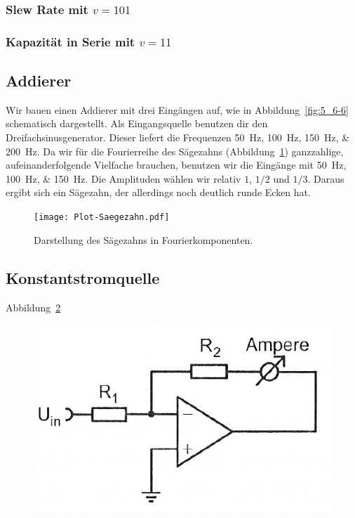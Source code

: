 \subsubsection{Slew Rate mit $v = 101$}

\subsubsection{Kapazität in Serie mit $v = 11$}

\FloatBarrier
\subsection{Addierer}

Wir bauen einen Addierer mit drei Eingängen auf, wie in
Abbildung~\ref{fig:5_6-6} schematisch dargestellt. Als Eingangsquelle benutzen
dir den Dreifachsinusgenerator. Dieser liefert die Frequenzen
\SIlist{50;100;150;200}{\hertz}. Da wir für die Fourierreihe des Sägezahns
(Abbildung~\ref{fig:saegezahn}) ganzzahlige, aufeinanderfolgende Vielfache
brauchen, benutzen wir die Eingänge mit \SIlist{50;100;150}{\hertz}. Die
Amplituden wählen wir relativ $1$, $1/2$ und $1/3$. Daraus ergibt sich ein
Sägezahn, der allerdings noch deutlich runde Ecken hat.

\begin{figure}[htbp]
	\centering
	\texttt{[image: Plot-Saegezahn.pdf]}
	\caption{%
		Darstellung des Sägezahns in Fourierkomponenten.
	}
	\label{fig:saegezahn}
\end{figure}

\FloatBarrier
\subsection{Konstantstromquelle}

Abbildung~\ref{fig:5-1}

\begin{figure}[htbp]
	\centering
	\includegraphics[width=.6\linewidth]{Anleitung/5-1.png}
	\caption{%
		\cite[Abbildung~5.1]{physik313-Anleitung}
	}
	\label{fig:5-1}
\end{figure}

